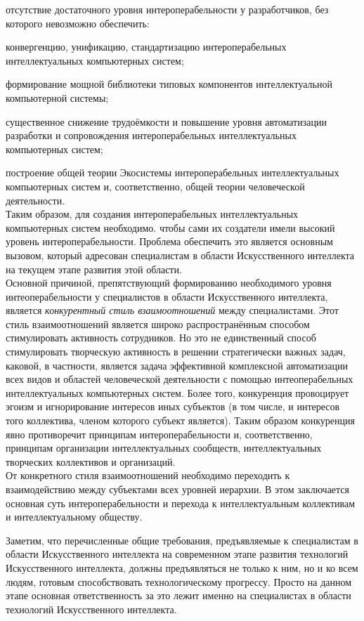 \begin{textitemize}
\begin{textitemize}
	\end{textitemize}
	\item отсутствие достаточного уровня интероперабельности у разработчиков, без которого невозможно обеспечить:
	\begin{textitemize}
		\item конвергенцию, унификацию, стандартизацию интероперабельных интеллектуальных компьютерных систем;
		\item формирование мощной библиотеки типовых компонентов интеллектуальной компьютерной системы;
		\item существенное снижение трудоёмкости и повышение уровня автоматизации разработки и сопровождения интероперабельных интеллектуальных компьютерных систем;
		\item построение общей теории Экосистемы интероперабельных интеллектуальных компьютерных систем и, соответственно, общей теории человеческой деятельности.\\
		Таким образом, для создания интероперабельных интеллектуальных компьютерных систем необходимо. чтобы сами их создатели имели высокий уровень интероперабельности. Проблема обеспечить это является основным вызовом, который адресован специалистам в области Искусственного интеллекта на текущем этапе развития этой области.\\
		Основной причиной, препятствующий формированию необходимого уровня интеоперабельности у специалистов в области Искусственного интеллекта, является \textit{конкурентный стиль взаимоотношений} между специалистами. Этот стиль взаимоотношений является широко распространённым способом стимулировать активность сотрудников. Но это не единственный способ стимулировать творческую активность в решении стратегически важных задач, каковой, в частности, является задача эффективной комплексной автоматизации всех видов и областей человеческой деятельности с помощью интеоперабельных интеллектуальных компьютерных систем. Более того, конкуренция провоцирует эгоизм и игнорирование интересов иных субъектов (в том числе, и интересов того коллектива, членом которого субъект является). Таким образом конкуренция явно противоречит принципам интероперабельности и, соответственно, принципам организации интеллектуальных сообществ, интеллектуальных творческих коллективов и организаций.\\
		От конкретного стиля взаимоотношений необходимо переходить к  взаимодействию между субъектами всех уровней иерархии. В этом заключается основная суть интероперабельности и перехода к интеллектуальным коллективам и интеллектуальному обществу.
	\end{textitemize}
	Заметим, что перечисленные общие требования, предъявляемые к специалистам в области Искусственного интеллекта на современном этапе развития технологий Искусственного интеллекта, должны предъявляться не только к ним, но и ко всем людям, готовым способствовать технологическому прогрессу. Просто на данном этапе основная ответственность за это лежит именно на специалистах в области технологий Искусственного интеллекта.
\end{textitemize}

